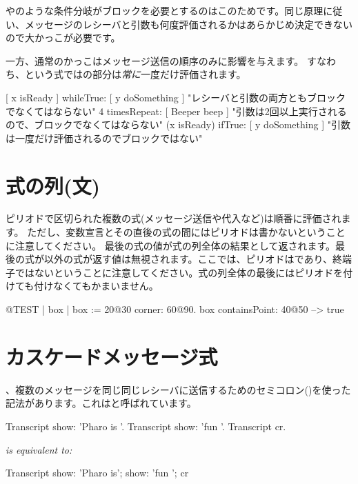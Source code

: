 \documentclass[a4paper,10pt,twoside]{book}
\begin{document}
やのような条件分岐がブロックを必要とするのはこのためです。同じ原理に従い、メッセージのレシーバと引数も何度評価されるかはあらかじめ決定できないので大かっこが必要です。

一方、通常のかっこはメッセージ送信の順序のみに影響を与えます。
すなわち、という式ではの部分は\emph{常に}一度だけ評価されます。

\begin{code}{}
[ x isReady ] whileTrue: [ y doSomething ]   "レシーバと引数の両方ともブロックでなくてはならない"
4 timesRepeat: [ Beeper beep ]                   "引数は2回以上実行されるので、ブロックでなくてはならない"
(x isReady) ifTrue: [ y doSomething ]           "引数は一度だけ評価されるのでブロックではない"
\end{code}

\section{式の列(文)}
ピリオドで区切られた複数の式(\ie メッセージ送信や代入など)は順番に評価されます。
ただし、変数宣言とその直後の式の間にはピリオドは書かないということに注意してください。
最後の式の値が式の列全体の結果として返されます。最後の式が以外の式が返す値は無視されます。ここでは、ピリオドはであり、終端子ではないということに注意してください。式の列全体の最後にはピリオドを付けても付けなくてもかまいません。

\begin{code}{@TEST}
| box |
box := 20@30 corner: 60@90.
box containsPoint: 40@50 --> true
\end{code}

\section{カスケードメッセージ式}
、複数のメッセージを同じ同じレシーバに送信するためのセミコロン(\ct{;})を使った記法があります。これはと呼ばれています。


\begin{minipage}{0.35\textwidth}
\begin{code}{}
Transcript show: 'Pharo is '.
Transcript show: 'fun '.
Transcript cr.
\end{code}
\end{minipage}
\emph{is equivalent to:}
\begin{minipage}{0.35\textwidth}
\begin{code}{}
Transcript        
   show: 'Pharo is';
   show: 'fun ';
   cr
\end{code}
\end{minipage}
\end{document}
